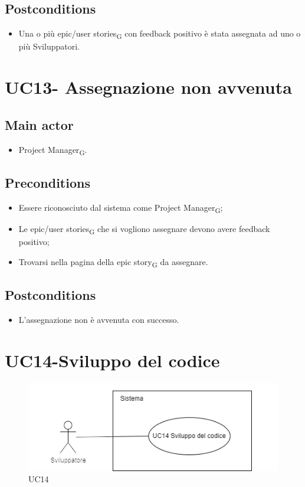\documentclass{article}
\begin{document}
    \subsection*{Postconditions}
        \begin{itemize}
            \item Una o più epic/user stories\textsubscript{G} con feedback positivo è stata assegnata ad uno o più Sviluppatori.
        \end{itemize}

\section{UC13- Assegnazione non avvenuta}

       \subsection*{Main actor}
    \begin{itemize}
        \item Project Manager\textsubscript{G}.
    \end{itemize}
    
    \subsection*{Preconditions}
        \begin{itemize}
            \item Essere riconosciuto dal sistema come Project Manager\textsubscript{G};
            \item Le epic/user stories\textsubscript{G} che si vogliono assegnare devono avere feedback positivo;
            \item Trovarsi nella pagina della epic story\textsubscript{G} da assegnare.
        \end{itemize}
        
    \subsection*{Postconditions}
        \begin{itemize}
            \item L'assegnazione non è avvenuta con successo.
        \end{itemize}
    
\section{UC14-Sviluppo del codice}
    \begin{figure}[h]
      \centering
      \includegraphics{./imgUML/UC14.png}
    \caption{UC14}
      \label{fig:UC14}
    \end{figure}
    
\end{document}
